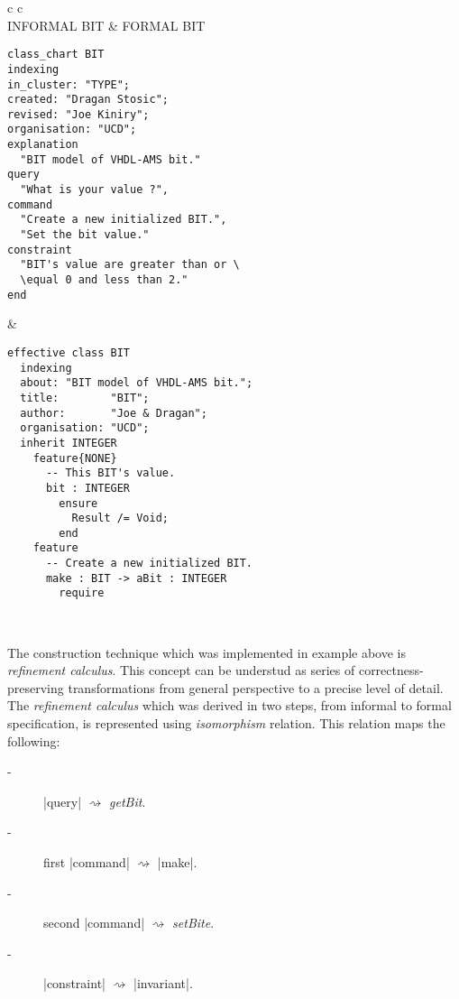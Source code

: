 \begin{center}
\begin{tabular}{ c  c }
\\ 
INFORMAL BIT & FORMAL BIT \\ 
\begin{minipage}[l]{6.4cm} 
\begin{lstlisting}[language=Bon]
class_chart BIT
indexing
in_cluster: "TYPE";
created: "Dragan Stosic";
revised: "Joe Kiniry";
organisation: "UCD";
explanation
  "BIT model of VHDL-AMS bit."
query
  "What is your value ?",
command
  "Create a new initialized BIT.",
  "Set the bit value."
constraint
  "BIT's value are greater than or \
  \equal 0 and less than 2."
end
\end{lstlisting}

\end{minipage}  
&
\begin{minipage}[l]{6.6cm}
\begin{lstlisting}[language=Bon]
effective class BIT
  indexing
  about: "BIT model of VHDL-AMS bit.";
  title:        "BIT";
  author:       "Joe & Dragan";
  organisation: "UCD"; 
  inherit INTEGER
    feature{NONE}
      -- This BIT's value.
      bit : INTEGER 
        ensure
          Result /= Void;
        end
    feature
      -- Create a new initialized BIT.
      make : BIT -> aBit : INTEGER
        require   
\end{lstlisting}
\end{minipage}\\
\begin{minipage}[l]{6.4cm}
The construction technique which was implemented in example above is
\emph{refinement calculus}. 
This concept  can be understud as series of correctness-preserving 
transformations from general perspective to a precise level of detail.
The \emph{refinement calculus} which was derived in two steps, 
from informal to formal specification, 
is represented using \emph{isomorphism} relation. 
This relation maps the following:
\begin{description}
\item[-] \lstinlinenb|query| $\rightsquigarrow$ \emph{getBit}.
\item[-] first \lstinlinenb|command| $\rightsquigarrow$ \lstinlinenb|make|.
\item[-] second \lstinlinenb|command| $\rightsquigarrow$ \emph{setBite}.
\item[-] \lstinlinenb|constraint| $\rightsquigarrow$ \lstinlinenb|invariant|.
\end{description}

\end{minipage}
\end{tabular}
\end{center}
